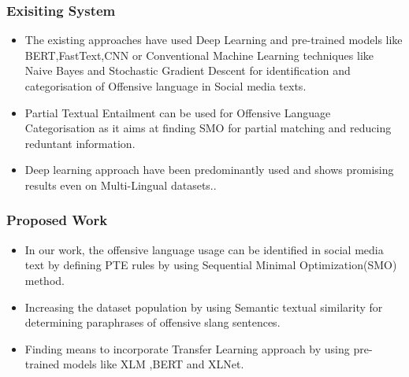 \documentclass{beamer}
\begin{document}
\begin{frame}\frametitle{Exisiting System}
 \begin{itemize}
 	\item The existing approaches have used Deep Learning and pre-trained models like BERT,FastText,CNN or Conventional Machine Learning techniques like Naive Bayes and Stochastic Gradient Descent for identification and categorisation of Offensive language in Social media texts\cite{ssnNLPSemEvalT6}\cite{stateofartSemEvalT6}.
 	\item Partial Textual Entailment can be used for Offensive Language Categorisation as it aims at finding SMO for partial matching and reducing reduntant information.\cite{partialTESocial}
 	\item Deep learning approach have been predominantly used and shows promising results even on Multi-Lingual datasets.\cite{benchmarkAggressionIden}. 	
\end{itemize}
\end{frame}

\begin{frame}\frametitle{Proposed Work}
  
    \begin{itemize}
      \item In our work, the offensive language usage can be identified in social media text by defining PTE rules by using Sequential Minimal Optimization(SMO) method.
      \item Increasing the dataset population by using Semantic textual similarity for determining paraphrases of offensive slang sentences.
      \item Finding means to incorporate Transfer Learning approach by using pre-trained models like XLM ,BERT and XLNet.

\end{itemize}
\end{frame}
\end{document}
